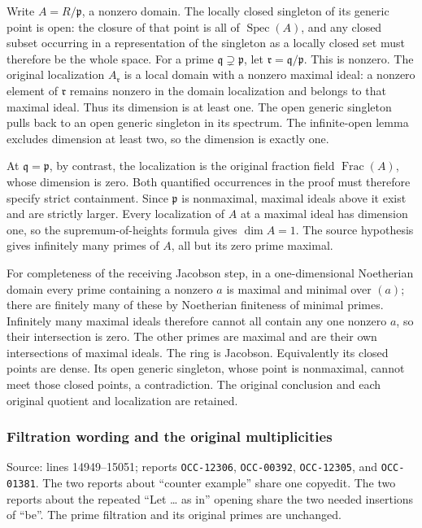 Write \(A=R/\mathfrak p\), a nonzero domain. The locally closed singleton of its generic point is open: the closure of that point is all of \(\operatorname{Spec}(A)\), and any closed subset occurring in a representation of the singleton as a locally closed set must therefore be the whole space. For a prime \(\mathfrak q\supsetneq\mathfrak p\), let \(\mathfrak r=\mathfrak q/\mathfrak p\). This is nonzero. The original localization \(A_{\mathfrak r}\) is a local domain with a nonzero maximal ideal: a nonzero element of \(\mathfrak r\) remains nonzero in the domain localization and belongs to that maximal ideal. Thus its dimension is at least one. The open generic singleton pulls back to an open generic singleton in its spectrum. The infinite-open lemma excludes dimension at least two, so the dimension is exactly one.

At \(\mathfrak q=\mathfrak p\), by contrast, the localization is the original fraction field \(\operatorname{Frac}(A)\), whose dimension is zero. Both quantified occurrences in the proof must therefore specify strict containment. Since \(\mathfrak p\) is nonmaximal, maximal ideals above it exist and are strictly larger. Every localization of \(A\) at a maximal ideal has dimension one, so the supremum-of-heights formula gives \(\dim A=1\). The source hypothesis gives infinitely many primes of \(A\), all but its zero prime maximal.

For completeness of the receiving Jacobson step, in a one-dimensional Noetherian domain every prime containing a nonzero \(a\) is maximal and minimal over \((a)\); there are finitely many of these by Noetherian finiteness of minimal primes. Infinitely many maximal ideals therefore cannot all contain any one nonzero \(a\), so their intersection is zero. The other primes are maximal and are their own intersections of maximal ideals. The ring is Jacobson. Equivalently its closed points are dense. Its open generic singleton, whose point is nonmaximal, cannot meet those closed points, a contradiction. The original conclusion and each original quotient and localization are retained.

\subsubsection{Filtration wording and the original multiplicities}\label{algebra-proof-004-filtration-wording-and-the-original-multiplicities}

Source: lines 14949--15051; reports \texttt{OCC-12306}, \texttt{OCC-00392}, \texttt{OCC-12305}, and \texttt{OCC-01381}. The two reports about ``counter example'' share one copyedit. The two reports about the repeated ``Let \ldots{} as in'' opening share the two needed insertions of ``be''. The prime filtration and its original primes are unchanged.

